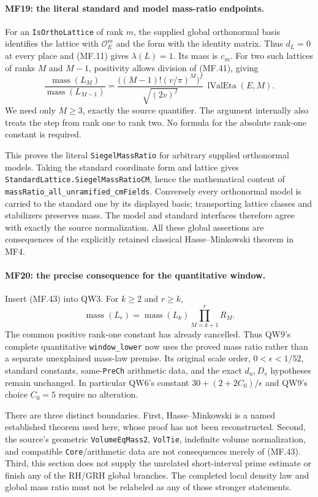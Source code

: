 \paragraph{MF19: the literal standard and model mass-ratio endpoints.}
For an \texttt{IsOrthoLattice} of rank \(m\), the supplied global
orthonormal basis identifies the lattice with
\(\mathcal O_E^m\) and the form with the identity matrix.
Thus \(d_L=0\) at every place and (MF.11) gives
\(\lambda(L)=1\). Its mass is \(c_m\).
For two such lattices of ranks \(M\) and \(M-1\), positivity allows
division of (MF.41), giving
\[
 \boxed{\displaystyle
 \frac{\operatorname{mass}(L_M)}{\operatorname{mass}(L_{M-1})}
    =\frac{\big((M-1)!(v/\pi)^M\big)^f}{\sqrt{(2v)^f}}\,
          \operatorname{lValEta}(E,M).}              \tag{MF.43}
\]
We need only \(M\ge3\), exactly the source quantifier.
The argument internally also treats the step from rank one to
rank two. No formula for the absolute rank-one constant is required.

This proves the literal \texttt{SiegelMassRatio} for arbitrary
supplied orthonormal models. Taking the standard coordinate form
and lattice gives \texttt{StandardLattice.SiegelMassRatioCM},
hence the mathematical content of
\texttt{massRatio\_all\_unramified\_cmFields}.
Conversely every orthonormal model is carried to the standard one
by its displayed basis; transporting lattice classes and stabilizers
preserves mass. The model and standard interfaces therefore agree
with exactly the source normalization. All these global assertions
are consequences of the explicitly retained classical
Hasse--Minkowski theorem in MF4.

\paragraph{MF20: the precise consequence for the quantitative window.}
Insert (MF.43) into QW3. For \(k\ge2\) and \(r\ge k\),
\[
        \operatorname{mass}(L_r)=\operatorname{mass}(L_k)
                         \prod_{M=k+1}^{r}R_M.        \tag{MF.44}
\]
The common positive rank-one constant has already cancelled.
Thus QW9's complete quantitative \texttt{window\_lower} now uses
the proved mass ratio rather than a separate unexplained mass-law
premise. Its original scale order, \(0<\epsilon<1/52\), standard
constants, same-\texttt{PreCh} arithmetic data, and the exact
\(d_u,D_s\) hypotheses remain unchanged.
In particular QW6's constant
\(30+(2+2C_0)/\epsilon\) and QW9's choice \(C_0=5\) require no
alteration.

There are three distinct boundaries. First, Hasse--Minkowski is
a named established theorem used here, whose proof has not been
reconstructed. Second, the source's geometric
\texttt{VolumeEqMass2}, \texttt{VolTie}, indefinite volume
normalization, and compatible \texttt{Core}/arithmetic data are
not consequences merely of (MF.43). Third, this section does not
supply the unrelated short-interval prime estimate or finish any
of the RH/GRH global branches. The completed local density law and
global mass ratio must not be relabeled as any of those stronger
statements.



